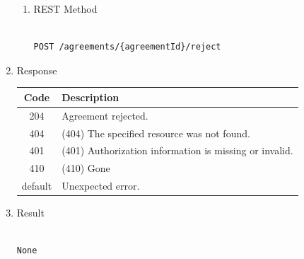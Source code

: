 \begin{enumerate}
\begin{enumerate}
\item REST Method

\begin{tcolorbox}[boxrule=0pt, frame empty]
\begin{verbatim} 

POST /agreements/{agreementId}/reject

\end{verbatim}
\end{tcolorbox}

\end{enumerate}

\item Response

\begin{center}
\begin{tabular}{|c|l|} 
\hline
\rowcolor{lightgray}	Code 		& 	Description \\
\hline
204	 		&	Agreement rejected. \\
\hline
404			&	(404) The specified resource was not found. \\
\hline
401			&	(401) Authorization information is missing or invalid. \\
\hline
410			&	(410) Gone \\
\hline
default		&	Unexpected error. \\
\hline
\end{tabular}
\end{center}

\item Result

\begin{tcolorbox}[boxrule=0pt, frame empty]
\begin{verbatim}

None

\end{verbatim}
\end{tcolorbox}



\end{enumerate}
